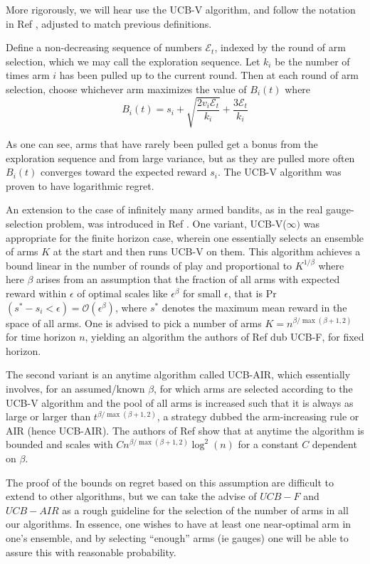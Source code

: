 More rigorously, we will hear use the UCB-V algorithm, and follow the notation in Ref \cite{infinitebandits}, adjusted to match previous definitions. 

Define a non-decreasing sequence of numbers $\mathcal{E}_t$, indexed by the round of arm selection, which we may call the exploration sequence. Let $k_i$ be the number of times arm $i$ has been pulled up to the current round. Then at each round of arm selection, choose whichever arm maximizes the value of $B_i(t)$ where \[B_i(t)=s_i+\sqrt{\frac{2v_i\mathcal{E}_t}{k_i}}+\frac{3\mathcal{E}_t}{k_i}\]

As one can see, arms that have rarely been pulled get a bonus from the exploration sequence and from large variance, but as they are pulled more often $B_i(t)$ converges toward the expected reward $s_i$. The UCB-V algorithm was proven to have logarithmic regret.

An extension to the case of infinitely many armed bandits, as in the real gauge-selection problem, was introduced in Ref \cite{infinitebandits}. One variant, UCB-V($\infty)$ was appropriate for the finite horizon case, wherein one essentially selects an ensemble of arms $K$ at the start and then runs UCB-V on them. This algorithm achieves a bound linear in the number of rounds of play and proportional to $K^{1/\beta}$ where here $\beta$ arises from an assumption that the fraction of all arms with expected reward within $\epsilon$ of optimal scales like $\epsilon^\beta$ for small $\epsilon$, that is Pr$(s^*-s_i<\epsilon) = \mathcal{O}(\epsilon^\beta)$, where $s^*$ denotes the maximum mean reward in the space of all arms. One is advised to pick a number of arms $K=n^{\beta/\max(\beta+1,2)}$ for time horizon $n$, yielding an algorithm the authors of Ref \cite{infinitebandits} dub UCB-F, for fixed horizon.

The second variant is an anytime algorithm called UCB-AIR, which essentially involves, for an assumed/known $\beta$, for which arms are selected according to the UCB-V algorithm and the pool of all arms is increased such that it is always as large or larger than $t^{\beta/\max(\beta+1,2)}$, a strategy dubbed the arm-increasing rule or AIR (hence UCB-AIR). The authors of Ref \cite{infinitebandits} show that at anytime the algorithm is bounded and scales with $C n^{\beta/\max(\beta+1,2)} \log^2(n)$ for a constant $C$ dependent on $\beta$.

The proof of the bounds on regret based on this assumption are difficult to extend to other algorithms, but we can take the advise of $UCB-F$ and $UCB-AIR$ as a rough guideline for the selection of the number of arms in all our algorithms. In essence, one wishes to have at least one near-optimal arm in one's ensemble, and by selecting ``enough'' arms (ie gauges) one will be able to assure this with reasonable probability. 

